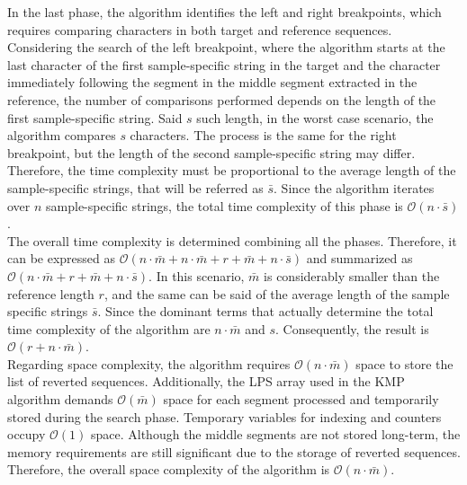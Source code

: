 In the last phase, the algorithm identifies the left and right breakpoints, which requires comparing characters in both target and reference sequences. Considering the search of the left breakpoint, where the algorithm starts at the last character of the first sample-specific string in the target and the character immediately following the segment in the middle segment extracted in the reference, the number of comparisons performed depends on the length of the first sample-specific string. Said \( s \) such length, in the worst case scenario, the algorithm compares \( s \) characters. The process is the same for the right breakpoint, but the length of the second sample-specific string may differ. Therefore, the time complexity must be proportional to the average length of the sample-specific strings, that will be referred as $\bar{s}$. Since the algorithm iterates over \( n \) sample-specific strings, the total time complexity of this phase is $\mathcal{O}(n \cdot \bar{s} )$. \\

The overall time complexity is determined combining all the phases. Therefore, it can be expressed as $\mathcal{O}(n \cdot \bar{m} + n \cdot \bar{m} + r + \bar{m} + n \cdot \bar{s})$ and summarized as $\mathcal{O}(n \cdot \bar{m} + r + \bar{m} + n \cdot \bar{s})$. In this scenario, $\bar{m}$ is considerably smaller than the reference length  \( r \), and the same can be said of the average length of the sample specific strings \( \bar{s} \). Since the dominant terms that actually determine the total time complexity of the algorithm are $n \cdot \bar{m}$ and \( s \). Consequently, the result is $\mathcal{O}(r + n \cdot \bar{m} )$. \\


Regarding space complexity, the algorithm requires $\mathcal{O}(n \cdot \bar{m} )$ space to store the list of reverted sequences. Additionally, the LPS array used in the KMP algorithm demands $\mathcal{O}(\bar{m} )$ space for each segment processed and temporarily stored during the search phase. Temporary variables for indexing and counters occupy $\mathcal{O}(1)$ space. Although the middle segments are not stored long-term, the memory requirements are still significant due to the storage of reverted sequences. Therefore, the overall space complexity of the algorithm is $\mathcal{O}(n \cdot \bar{m} )$.
